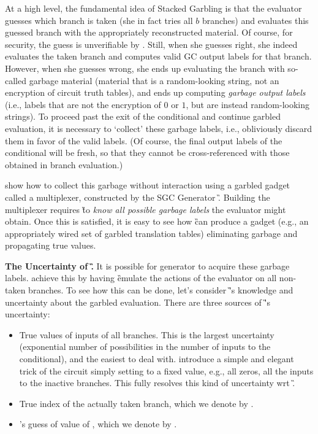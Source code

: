 At a high level, the fundamental idea of Stacked Garbling is that the evaluator \E
guesses which branch is taken (she in fact tries  all $b$
branches) and evaluates this guessed branch with the appropriately reconstructed material.  Of course, for security, the guess is unverifiable by \E. 
Still, when she guesses right, she indeed evaluates the taken branch and
computes valid GC output labels for that branch.
However, when she guesses wrong, she ends up evaluating the branch
with so-called garbage material (material that is a random-looking string, not
an encryption of circuit truth tables), and ends up computing
\emph{garbage output labels} (i.e., labels that are not the encryption
of $0$ or $1$, but are instead random-looking strings).
%
To proceed past the exit of the conditional and continue garbled evaluation, it is necessary to
`collect'  these garbage labels, i.e., obliviously  discard them in favor of the valid
labels.  (Of course, the final output labels of the conditional will be fresh,  so that they cannot be cross-referenced with those obtained in branch evaluation.)


\HK show how to collect this garbage without
interaction using a 
garbled gadget called a multiplexer, constructed by the SGC Generator \G.  
Building the \HK multiplexer requires \G to {\em know all possible
garbage labels} the evaluator might obtain.  Once this is satisfied, it is easy to see how \G can produce a gadget (e.g., an appropriately wired set of garbled translation tables) eliminating garbage and propagating true values.


{\bf The Uncertainty of \G.}
It is possible for generator to acquire these garbage labels.  \HK achieve this by having \G  emulate the actions of the
evaluator \E on all non-taken branches.  To see how this can be done, let's consider \G's knowledge and uncertainty about the garbled evaluation.  There are three sources of \G's uncertainty:
\begin{itemize}
	\item True values of inputs of all branches.  This is the largest uncertainty (exponential number of possibilities in the number of inputs to the conditional), and the easiest to deal with.  \HK introduce a simple and elegant trick of the circuit simply setting to a fixed value, e.g., all zeros, all the inputs to the inactive branches.  This fully resolves this kind of uncertainty wrt \G.
	\item True index of the actually taken branch, which we denote by \truth.
	\item \E's guess of value of \truth, which we denote by \guess.
\end{itemize}

